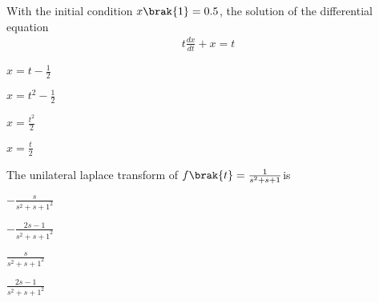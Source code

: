 \iffalse
\chapter{2011}
\author{EE24BTECH11005}
\section{ee}
\fi
    \item With the initial condition $x\brak{1}=0.5$, the solution of the differential equation 
        \begin{align*}
            t\frac{dx}{dt}+x=t
        \end{align*}
        \begin{enumerate}
                \begin{multicols}{2}
                \item $x=t-\frac{1}{2}$
                    \columnbreak
                \item $x=t^2-\frac{1}{2}$
                \end{multicols}
                \begin{multicols}{2}
                \item $x=\frac{t^2}{2}$
                    \columnbreak
                \item $x=\frac{t}{2}$

                \end{multicols}
        \end{enumerate}
    \item The unilateral laplace transform of $f\brak{t}=\frac{1}{s^2+s+1}$is
        \begin{enumerate}
                \begin{multicols}{2}
                \item $-\frac{s}{{s^2+s+1}^2}$
                    \columnbreak
                \item $-\frac{2s-1}{{s^2+s+1}^2}$

                \end{multicols}
                \begin{multicols}{2}
                \item $\frac{s}{{s^2+s+1}^2}$

                    \columnbreak
                \item$\frac{2s-1}{{s^2+s+1}^2}$

                \end{multicols}
        \end{enumerate}
